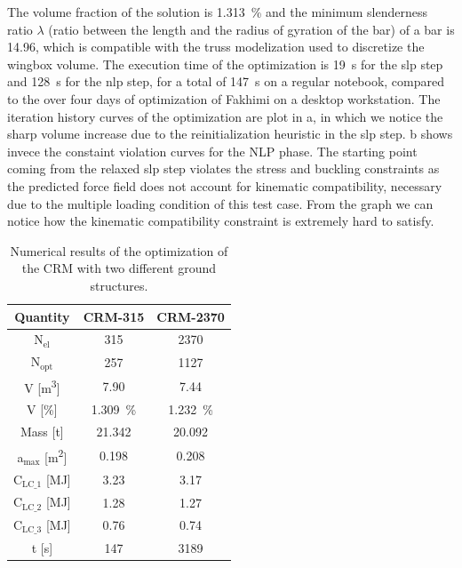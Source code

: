     The volume fraction of the solution is \qty{1.313}{\percent} and the minimum slenderness ratio $\lambda$ (ratio between the length and the radius of gyration of the bar) of a bar is 14.96, which is compatible with the truss modelization used to discretize the wingbox volume. The execution time of the optimization is \qty{19}{s} for the \gls{slp} step and \qty{128}{s} for the \gls{nlp} step, for a total of \qty{147}{s} on a regular notebook, compared to the over four days of optimization of Fakhimi \cite{fakhimi_discrete_2021} on a desktop workstation. The iteration history curves of the optimization are plot in a, in which we notice the sharp volume increase due to the reinitialization heuristic in the \gls{slp} step. b shows invece the constaint violation curves for the NLP phase. The starting point coming from the relaxed \gls{slp} step violates the stress and buckling constraints as the predicted force field does not account for kinematic compatibility, necessary due to the multiple loading condition of this test case. From the graph we can notice how the kinematic  compatibility constraint is extremely hard to satisfy.

    \begin{table}
        \small
        \centering
        \begin{tabular}{ccc}
        \toprule
        \textbf{Quantity} & \textbf{CRM-315} & \textbf{CRM-2370} \\ \midrule
        N$_{\text{el}}$          & 315               & 2370               \\
        N$_{\text{opt}}$           & 257                  &  1127              \\
        V [\unit{\meter^3}]             &  7.90                 &  7.44             \\
        V [\unit{\%}]             &   \qty{1.309}{\%}                & \qty{1.232}{\%}               \\
        Mass [\unit{\tonne}]               &   21.342                & 20.092     \\
        a$_{\text{max}}$ [\unit{\meter^2}]           &  0.198                 & 0.208              \\
        C$_\text{LC\_1}$ [\unit{\mega \joule}]                &  3.23                 &  3.17              \\
        C$_\text{LC\_2}$ [\unit{\mega \joule}]                &   1.28                &  1.27              \\
        C$_\text{LC\_3}$ [\unit{\mega \joule}]                &   0.76                &  0.74              \\
        t [\unit{\second}]                & 147                  & 3189   \\ \bottomrule            
        \end{tabular}
        \caption{Numerical results of the optimization of the CRM with two different ground structures.}
        \label{tab:07_wing-res}
    \end{table}

